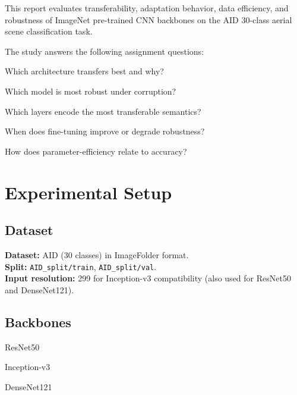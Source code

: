 \documentclass[11pt,a4paper]{report}
\renewenvironment{leftbar}[1][\hsize]
  {\def\FrameCommand{{\color{subsectionblue}\vrule width 3pt}\hspace{0pt}}%
   \MakeFramed{\hsize#1\advance\hsize-\width\FrameRestore}}
  {\endMakeFramed}
\renewenvironment{itemize}{\begin{leftbar}\begin{originalitemize}}{\end{originalitemize}\end{leftbar}}
\begin{document}
This report evaluates transferability, adaptation behavior, data efficiency, and robustness of ImageNet pre-trained CNN backbones on the AID 30-class aerial scene classification task.

The study answers the following assignment questions:
\begin{itemize}
  \item Which architecture transfers best and why?
  \item Which model is most robust under corruption?
  \item Which layers encode the most transferable semantics?
  \item When does fine-tuning improve or degrade robustness?
  \item How does parameter-efficiency relate to accuracy?
\end{itemize}

\chapter{Experimental Setup}

\section{Dataset}
\textbf{Dataset:} AID (30 classes) in ImageFolder format.\\
\textbf{Split:} \texttt{AID\_split/train}, \texttt{AID\_split/val}.\\
\textbf{Input resolution:} 299 for Inception-v3 compatibility (also used for ResNet50 and DenseNet121).

\section{Backbones}
\begin{itemize}
  \item ResNet50
  \item Inception-v3
  \item DenseNet121
\end{itemize}
\end{document}
